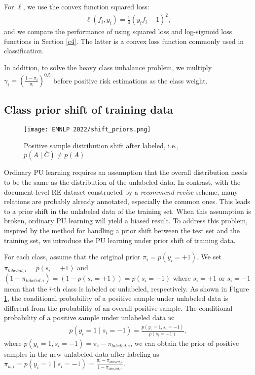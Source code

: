 \documentclass[11pt]{article}
\begin{document}
For $\ell$, we use the convex function squared loss:
\begin{equation}
\begin{aligned}\label{eq8}
\ell(f_{i}, y_{i})=\frac{1}{4}(y_{i}f_{i}-1)^{2},
\end{aligned}
\end{equation}
and we compare the performance of using squared loss and log-sigmoid loss functions in Section \ref{c4}. The latter is a convex loss function commonly used in classification.

In addition, to solve the heavy class imbalance problem, we multiply $\gamma_{i}=(\frac{1-\pi_{i}}{\pi_{i}})^{0.5}$ before positive risk estimations as the class weight.

\subsection{Class prior shift of training data}
\begin{figure}
\centering
\texttt{[image: EMNLP 2022/shift\_priors.png]} 
\caption{Positive sample distribution shift after labeled, i.e., $p(A \mid \overline{C}) \neq p(A)$}
\label{fig2}
\end{figure}
Ordinary PU learning requires an assumption that the overall distribution needs to be the same as the distribution of the unlabeled data. In contrast, with the document-level RE dataset constructed by a \emph{recommend-revise} scheme, many relations are probably already annotated, especially the common ones. This leads to a prior shift in the unlabeled data of the training set. When this assumption is broken, ordinary PU learning will yield a biased result. To address this problem, inspired by the method \citep{charoenphakdee2019positive} for handling a prior shift between the test set and the training set, we introduce the PU learning under prior shift of training data.

For each class, assume that the original prior $\pi_{i}=p(y_{i}=+1)$. We set $\pi_{labeled,i}=p(s_{i}=+1)$ and $(1-\pi_{labeled,i})=(1-p(s_{i}=+1))=p(s_{i}=-1)$ where $s_{i}=+1$ or $s_{i}=-1$ mean that the $i$-th class is labeled or unlabeled, respectively. As shown in Figure \ref{fig2}, the conditional probability of a positive sample under unlabeled data is different from the probability of an overall positive sample. The conditional probability of a positive sample under unlabeled data is:
\begin{equation}
\begin{aligned}\label{eq9}
p(y_{i}=1 \mid s_{i}=-1)=\frac{p(y_{i}=1, s_{i}=-1)}{p(s_{i}=-1)},
\end{aligned}
\end{equation}
where $p(y_{i}=1, s_{i}=-1)=\pi_{i}-\pi_{labeled,i}$, we can obtain the prior of positive samples in the new unlabeled data after labeling as $\pi_{u,i}=p(y_{i}=1 \mid s_{i}=-1)=\frac{\pi_{i}-\pi_{labeled,i}}{1-\pi_{labeled,i}}$. 
\end{document}
